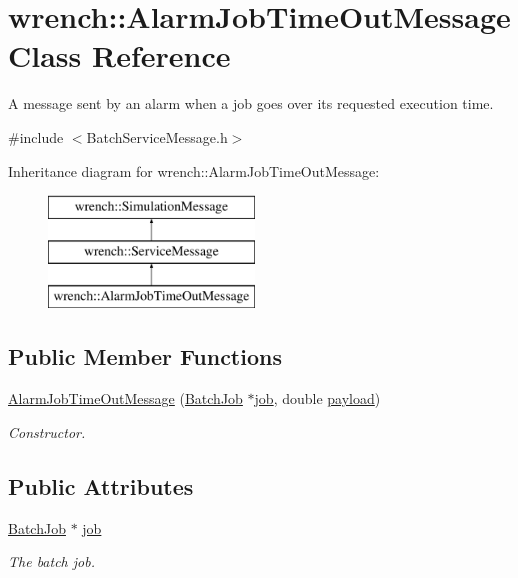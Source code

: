 \hypertarget{classwrench_1_1_alarm_job_time_out_message}{}\section{wrench\+:\+:Alarm\+Job\+Time\+Out\+Message Class Reference}
\label{classwrench_1_1_alarm_job_time_out_message}


A message sent by an alarm when a job goes over its requested execution time.  




{\ttfamily \#include $<$Batch\+Service\+Message.\+h$>$}

Inheritance diagram for wrench\+:\+:Alarm\+Job\+Time\+Out\+Message\+:\begin{figure}[H]
\begin{center}
\leavevmode
\includegraphics[height=3.000000cm]{classwrench_1_1_alarm_job_time_out_message}
\end{center}
\end{figure}
\subsection*{Public Member Functions}
\begin{DoxyCompactItemize}
\item 
\hyperlink{classwrench_1_1_alarm_job_time_out_message_af50834d57804dae7762206580fe891b3}{Alarm\+Job\+Time\+Out\+Message} (\hyperlink{classwrench_1_1_batch_job}{Batch\+Job} $\ast$\hyperlink{classwrench_1_1_alarm_job_time_out_message_a00521158b34e24b78e904cedd9801b30}{job}, double \hyperlink{classwrench_1_1_simulation_message_a914f2732713f7c02898e66f05a7cb8a1}{payload})
\begin{DoxyCompactList}\small\item\em Constructor. \end{DoxyCompactList}\end{DoxyCompactItemize}
\subsection*{Public Attributes}
\begin{DoxyCompactItemize}
\item 
\mbox{\label{classwrench_1_1_alarm_job_time_out_message_a00521158b34e24b78e904cedd9801b30}} 
\hyperlink{classwrench_1_1_batch_job}{Batch\+Job} $\ast$ \hyperlink{classwrench_1_1_alarm_job_time_out_message_a00521158b34e24b78e904cedd9801b30}{job}
\begin{DoxyCompactList}\small\item\em The batch job. \end{DoxyCompactList}\end{DoxyCompactItemize}
